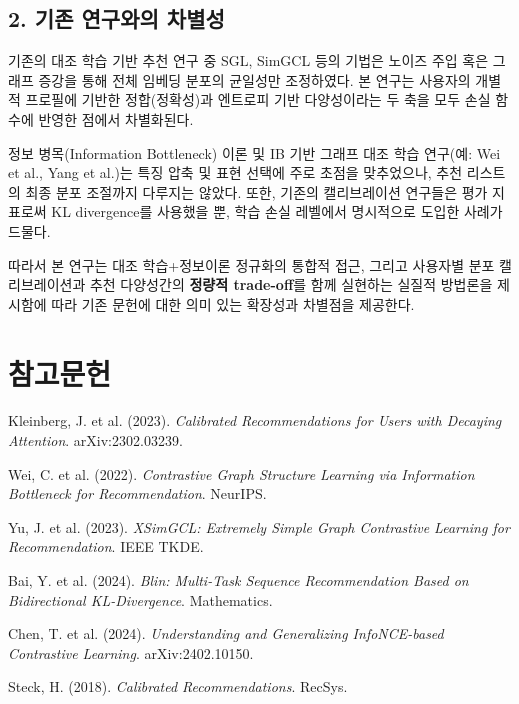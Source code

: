 \documentclass[a4paper, 12pt]{article}
\begin{document}
\subsection*{2. 기존 연구와의 차별성}

기존의 대조 학습 기반 추천 연구 중 SGL, SimGCL 등의 기법은 노이즈 주입 혹은 그래프 증강을 통해 전체 임베딩 분포의 균일성만 조정하였다. 본 연구는 사용자의 개별적 프로필에 기반한 정합(정확성)과 엔트로피 기반 다양성이라는 두 축을 모두 손실 함수에 반영한 점에서 차별화된다.

정보 병목(Information Bottleneck) 이론 및 IB 기반 그래프 대조 학습 연구(예: Wei et al., Yang et al.)는 특징 압축 및 표현 선택에 주로 초점을 맞추었으나, 추천 리스트의 최종 분포 조절까지 다루지는 않았다. 또한, 기존의 캘리브레이션 연구들은 평가 지표로써 KL divergence를 사용했을 뿐, 학습 손실 레벨에서 명시적으로 도입한 사례가 드물다.

따라서 본 연구는 대조 학습+정보이론 정규화의 통합적 접근, 그리고 사용자별 분포 캘리브레이션과 추천 다양성간의 \textbf{정량적 trade-off}를 함께 실현하는 실질적 방법론을 제시함에 따라 기존 문헌에 대한 의미 있는 확장성과 차별점을 제공한다.

\vspace{2em}
\section*{참고문헌}
\begin{enumerate}[label={[\arabic*]}]
    \item Kleinberg, J. et al. (2023). \textit{Calibrated Recommendations for Users with Decaying Attention}. arXiv:2302.03239.
    \item Wei, C. et al. (2022). \textit{Contrastive Graph Structure Learning via Information Bottleneck for Recommendation}. NeurIPS.
    \item Yu, J. et al. (2023). \textit{XSimGCL: Extremely Simple Graph Contrastive Learning for Recommendation}. IEEE TKDE.
    \item Bai, Y. et al. (2024). \textit{Blin: Multi-Task Sequence Recommendation Based on Bidirectional KL-Divergence}. Mathematics.
    \item Chen, T. et al. (2024). \textit{Understanding and Generalizing InfoNCE-based Contrastive Learning}. arXiv:2402.10150.
    \item Steck, H. (2018). \textit{Calibrated Recommendations}. RecSys.
\end{enumerate}
\end{document}
